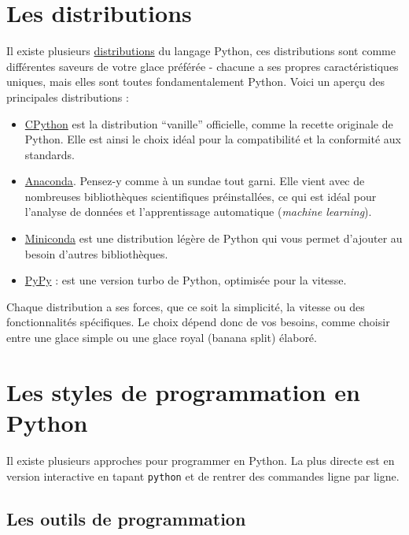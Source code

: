 \documentclass[
  11pt,
  letterpaper,
  open=any,
  twoside=false,
  french]{scrbook}
\begin{document}
\section{Les distributions}\label{les-distributions}

Il existe plusieurs
\href{https://wiki.python.org/moin/PythonDistributions}{distributions}
du langage Python, ces distributions sont comme différentes saveurs de
votre glace préférée - chacune a ses propres caractéristiques uniques,
mais elles sont toutes fondamentalement Python. Voici un aperçu des
principales distributions :

\begin{itemize}
\item
  \href{https://www.python.org/downloads/}{CPython} est la distribution
  ``vanille'' officielle, comme la recette originale de Python. Elle est
  ainsi le choix idéal pour la compatibilité et la conformité aux
  standards.
\item
  \href{https://www.anaconda.com/download}{Anaconda}. Pensez-y comme à
  un sundae tout garni. Elle vient avec de nombreuses bibliothèques
  scientifiques préinstallées, ce qui est idéal pour l'analyse de
  données et l'apprentissage automatique (\emph{machine learning}).
\item
  \href{https://docs.anaconda.com/miniconda/miniconda-install/}{Miniconda}
  est une distribution légère de Python qui vous permet d'ajouter au
  besoin d'autres bibliothèques.
\item
  \href{https://pypy.org/}{PyPy} : est une version turbo de Python,
  optimisée pour la vitesse.
\end{itemize}

Chaque distribution a ses forces, que ce soit la simplicité, la vitesse
ou des fonctionnalités spécifiques. Le choix dépend donc de vos besoins,
comme choisir entre une glace simple ou une glace royal (banana split)
élaboré.

\section{Les styles de programmation en
Python}\label{les-styles-de-programmation-en-python}

Il existe plusieurs approches pour programmer en Python. La plus directe
est en version interactive en tapant \texttt{python} et de rentrer des
commandes ligne par ligne.

\subsection{Les outils de
programmation}\label{les-outils-de-programmation}
\end{document}
